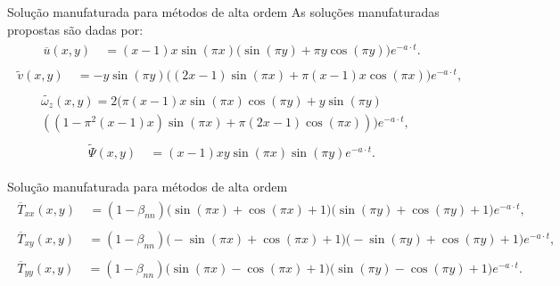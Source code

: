 \begin{frame}{Solução manufaturada para métodos de alta ordem}
As soluções manufaturadas propostas são dadas por:
\begin{gather}
    \begin{aligned}
        \overline{u}(x,y) &~= (x-1) x \sin(\pi x) \bigg(\sin(\pi y)+\pi y \cos(\pi y)\bigg) e^{-a\cdot t}.\label{eq:u_case0_2}
    \end{aligned}
\end{gather}
\begin{gather}
    \begin{aligned}
        \widetilde{v}(x,y) &~= -y\sin(\pi y)\bigg((2x-1)\sin(\pi x)+\pi(x-1)x\cos(\pi x)\bigg)e^{-a\cdot t},\label{eq:v_case0_2}
    \end{aligned}
\end{gather}
\begin{gather}
    \begin{aligned}
        \widetilde{\omega_{z}}(x,y) = 2\bigg(\pi(x-1)x\sin(\pi x)\cos(\pi y)+y\sin(\pi y) &~ \\ \left(\left(1-\pi^2(x-1)x\right)\sin(\pi x)+\pi(2x - 1)\cos(\pi x)\right)\bigg)e^{-a\cdot t},\label{eq:wz_case0_2}
    \end{aligned}
\end{gather}
\begin{gather}
    \begin{aligned}
        \widetilde{\Psi}(x,y) &~= (x-1) x y\sin(\pi x)\sin(\pi y) e^{-a\cdot t}.\label{eq:psi_case0_2}
    \end{aligned}
\end{gather}
\end{frame}

\begin{frame}{Solução manufaturada para métodos de alta ordem}
\begin{gather}
    \begin{aligned}
        \overline{T}_{xx}(x,y) &~= (1-\beta_{nn})\bigg(\sin(\pi x)+\cos(\pi x)+1\bigg)\bigg(\sin(\pi  y)+\cos (\pi y)+1\bigg)e^{-a\cdot t},\label{eq:txx_case0_2}
    \end{aligned}
\end{gather}
\begin{gather}
    \begin{aligned}
        \overline{T}_{xy}(x,y) &~= (1-\beta_{nn})\bigg(-\sin(\pi x)+\cos (\pi x)+1\bigg)\bigg(-\sin (\pi  y)+\cos (\pi  y)+1\bigg)e^{-a\cdot t},\label{eq:txy_case0_2}
    \end{aligned}
\end{gather}
\begin{gather}
    \begin{aligned}
        \overline{T}_{yy}(x,y) &~= (1-\beta_{nn})\bigg(\sin(\pi x)-\cos(\pi  x)+1\bigg)\bigg(\sin(\pi y)-\cos(\pi y)+1\bigg)e^{-a\cdot t}.\label{eq:tyy_case0_2}
    \end{aligned}
\end{gather}
\end{frame}